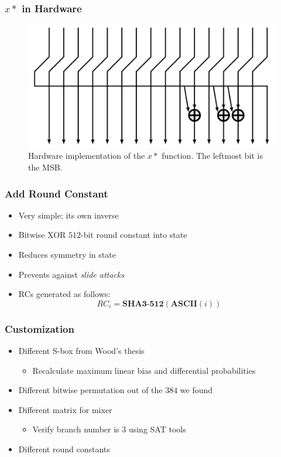 \begin{frame}
\frametitle{$x*$ in Hardware}
\begin{figure}[ht]
\centering
\includegraphics[width=\textwidth]{img/xTimes.pdf}
\caption{Hardware implementation of the $x*$ function. The leftmost bit is the MSB.}
\end{figure}
\end{frame}

\begin{frame}
\frametitle{Add Round Constant}
\begin{itemize}
  \item Very simple; its own inverse
  \item Bitwise XOR $512$-bit round constant into state
  \item Reduces symmetry in state
  \item Prevents against \emph{slide attacks}
  \item RCs generated as follows:
  \begin{equation*}
  RC_i = \mathbf{SHA3\textbf{-}512}(\mathbf{ASCII}(i))
  \end{equation*}
\end{itemize}
\end{frame}

\begin{frame}
\frametitle{Customization}
\begin{itemize}
  \item Different S-box from Wood's thesis
  \begin{itemize}
    \item Recalculate maximum linear bias and differential probabilities
  \end{itemize}
  \item Different bitwise permutation out of the $384$ we found
  \item Different matrix for mixer
  \begin{itemize}
    \item Verify branch number is 3 using SAT tools 
  \end{itemize} 
  \item Different round constants
\end{itemize}
\end{frame}

